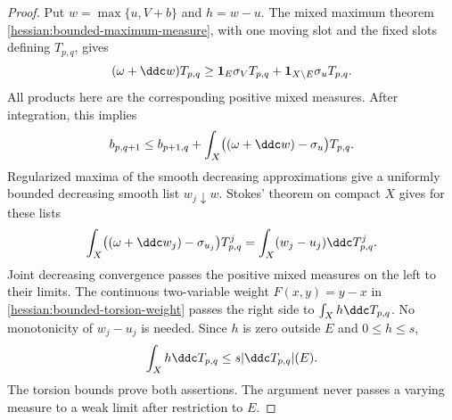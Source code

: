\begin{proof}
Put $w=\max\{u,V+b\}$ and $h=w-u$.
The mixed maximum theorem \cref{hessian:bounded-maximum-measure},
with one moving slot and the fixed slots defining $T_{p,q}$, gives
\[
 (\omega+\ddc w)T_{p,q}
 \geq\mathbf1_E\sigma_VT_{p,q}
                +\mathbf1_{X\setminus E}\sigma_uT_{p,q}.
\]
All products here are the corresponding positive mixed measures.
After integration, this implies
\[
 b_{p,q+1}\leq b_{p+1,q}
       +\int_X\bigl((\omega+\ddc w)-\sigma_u\bigr)T_{p,q}.
\]
Regularized maxima of the smooth decreasing approximations give
a uniformly bounded decreasing smooth list $w_j\downarrow w$.
Stokes' theorem on compact $X$ gives for these lists
\[
 \int_X\bigl((\omega+\ddc w_j)-\sigma_{u_j}\bigr)T_{p,q}^j
                      =\int_X(w_j-u_j)\ddc T_{p,q}^j.
\]
Joint decreasing convergence passes the positive mixed measures
on the left to their limits. The continuous two-variable weight
$F(x,y)=y-x$ in \cref{hessian:bounded-torsion-weight} passes the
right side to $\int_Xh\ddc T_{p,q}$. No monotonicity of $w_j-u_j$
is needed. Since $h$ is zero outside $E$ and $0\leq h\leq s$,
\[
 \int_Xh\ddc T_{p,q}\leq s|\ddc T_{p,q}|(E).
\]
The torsion bounds prove both assertions. The argument never
passes a varying measure to a weak limit after restriction to $E$.
\end{proof}

